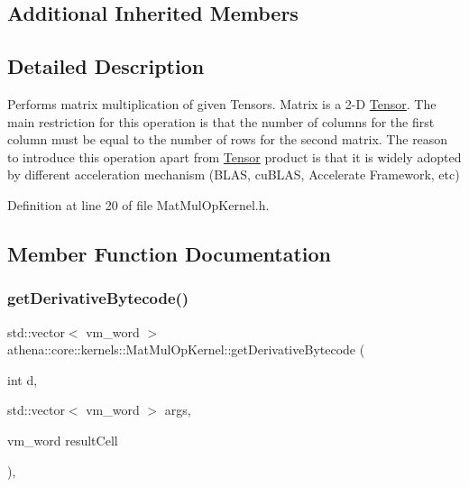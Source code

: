 \subsection*{Additional Inherited Members}


\subsection{Detailed Description}
Performs matrix multiplication of given Tensors. Matrix is a 2-\/D \mbox{\hyperlink{classathena_1_1core_1_1_tensor}{Tensor}}. The main restriction for this operation is that the number of columns for the first column must be equal to the number of rows for the second matrix. The reason to introduce this operation apart from \mbox{\hyperlink{classathena_1_1core_1_1_tensor}{Tensor}} product is that it is widely adopted by different acceleration mechanism (B\+L\+AS, cu\+B\+L\+AS, Accelerate Framework, etc) 

Definition at line 20 of file Mat\+Mul\+Op\+Kernel.\+h.



\subsection{Member Function Documentation}
\mbox{\label{classathena_1_1core_1_1kernels_1_1_mat_mul_op_kernel_a42d08b8004e8033e01988eb2392215c8}} 
\subsubsection{\texorpdfstring{get\+Derivative\+Bytecode()}{getDerivativeBytecode()}}
{\footnotesize\ttfamily std\+::vector$<$ vm\+\_\+word $>$ athena\+::core\+::kernels\+::\+Mat\+Mul\+Op\+Kernel\+::get\+Derivative\+Bytecode (\begin{DoxyParamCaption}\item[{int}]{d,  }\item[{std\+::vector$<$ vm\+\_\+word $>$}]{args,  }\item[{vm\+\_\+word}]{result\+Cell }\end{DoxyParamCaption})\hspace{0.3cm}{\ttfamily [override]}, {\ttfamily [virtual]}}

